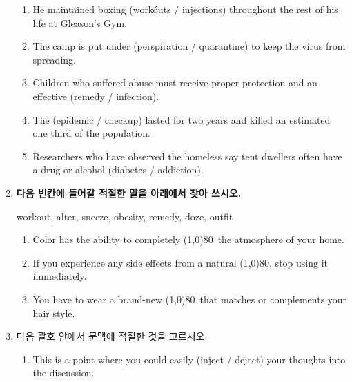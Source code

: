 \documentclass[a4wide,14pt]{extarticle}
\begin{document}
\begin{enumerate}[label=$\spadesuit$]
\begin{enumerate}[label={\textbf{\arabic*.}}]
	\item He maintained boxing (workóuts / injections) throughout the rest of his life at Gleason's Gym.

	\item The camp is put under (perspiration / quarantine) to keep the virus from spreading.

	\item Children who suffered abuse must receive proper protection and an effective (remedy /
	infection).

	\item The (epidemic / checkup) lasted for two years and killed an estimated one third of the population.

	\item Researchers who have observed the homeless say tent dwellers often have a drug or alcohol (diabetes / addiction).

	\end{enumerate}

\newpage

\item \textbf{다음 빈칸에 들어갈 적절한 말을 아래에서 찾아 쓰시오.}

	\begin{tcolorbox}
		\begin{center}
		workout, alter, sneeze, obesity, remedy, doze, outfit
		\end {center}
	\end{tcolorbox}

		\begin{enumerate}[label={\textbf{\arabic*.}}, start=1]
			\item Color has the ability to completely \line(1,0){80}\ the atmosphere of your home.

			\item If you experience any side effects from a natural \line(1,0){80}, stop using it immediately.

			\item You have to wear a brand-new \line(1,0){80}\ that matches or complements your hair style.
		\end{enumerate}


\item 다음 괄호 안에서 문맥에 적절한 것을 고르시오.


	 \begin{enumerate}[label={\textbf{\arabic*.}}, start=1]

	 	\item This is a point where you could easily (inject / deject) your thoughts into the discussion.


\end{enumerate}
\end{enumerate}
\end{document}

